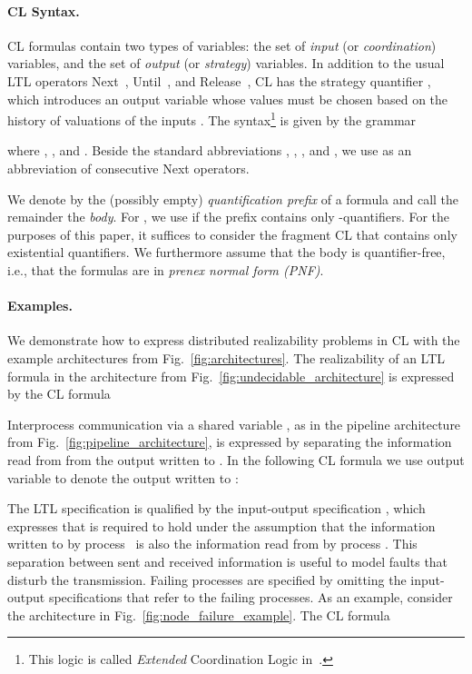 \documentclass{LMCS}
\theoremstyle{plain}\newtheorem{theorem}[thm]{Theorem}
\theoremstyle{plain}\newtheorem{lemma}[thm]{Lemma}
\theoremstyle{plain}\newtheorem{proposition}[thm]{Proposition}
\theoremstyle{plain}\newtheorem{corollary}[thm]{Corollary}
\theoremstyle{definition}\newtheorem{definition}{Definition}[section]
\begin{document}
\paragraph{\bf CL Syntax.}
CL formulas contain two types of variables: the set  of \emph{input} (or \emph{coordination}) variables, and the set  of \emph{output} (or \emph{strategy}) variables.
In addition to the usual LTL operators Next~, Until~, and Release~, CL has the strategy quantifier , which introduces an output variable  whose values must be chosen based on the history of valuations of the inputs .
The syntax\footnote{This logic is called \emph{Extended} Coordination Logic in~\cite{DBLP:conf/csl/FinkbeinerS10}.} is given by the grammar

where , , and .
Beside the standard abbreviations , , , and , we use  as an abbreviation of  consecutive Next operators.

We denote by  the (possibly empty) \emph{quantification prefix} of a formula and call the remainder the \emph{body}.
For , we use  if the prefix contains only -quantifiers.
For the purposes of this paper, it suffices to consider the fragment CL that contains only existential quantifiers.
We furthermore assume that the body is quantifier-free, i.e., that the formulas are in \emph{prenex normal form (PNF)}.

\paragraph{\bf Examples.}
We demonstrate how to express distributed realizability problems in CL with the example architectures from Fig.~\ref{fig:architectures}.
The realizability of an LTL formula  in the architecture from Fig.~\ref{fig:undecidable_architecture} is expressed by the CL formula 

Interprocess communication via a shared variable , as in the pipeline architecture from Fig.~\ref{fig:pipeline_architecture}, is expressed by separating the information read from  from the output written to .
In the following CL formula we use output variable  to denote the output written to :

The LTL specification  is qualified by the input-output specification , which expresses that  is required to hold under the assumption that the information written to  by process~ is also the information read from  by process . This separation between sent and received information is useful to model faults that disturb the transmission. Failing processes are specified by omitting the input-output specifications that refer to the failing processes. As an example, consider the architecture in Fig.~\ref{fig:node_failure_example}. The CL formula
\end{document}
